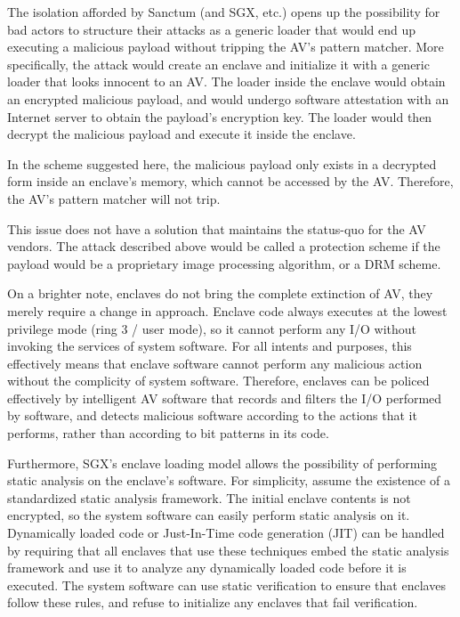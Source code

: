 The isolation afforded by Sanctum (and SGX, etc.) opens up the possibility for
bad actors to structure their attacks as a generic loader that would end up
executing a malicious payload without tripping the AV's pattern matcher.  More
specifically, the attack would create an enclave and initialize it with a
generic loader that looks innocent to an AV. The loader inside the enclave
would obtain an encrypted malicious payload, and would undergo software
attestation with an Internet server to obtain the payload's encryption key. The
loader would then decrypt the malicious payload and execute it inside the
enclave.

In the scheme suggested here, the malicious payload only exists in a decrypted
form inside an enclave's memory, which cannot be accessed by the AV. Therefore,
the AV's pattern matcher will not trip.

This issue does not have a solution that maintains the status-quo for the AV
vendors. The attack described above would be called a protection scheme if the
payload would be a proprietary image processing algorithm, or a DRM scheme.

On a brighter note, enclaves do not bring the complete extinction of AV, they
merely require a change in approach. Enclave code always executes at the lowest
privilege mode (ring 3 / user mode), so it cannot perform any I/O without
invoking the services of system software. For all intents and purposes, this
effectively means that enclave software cannot perform any malicious action
without the complicity of system software. Therefore, enclaves can be policed
effectively by intelligent AV software that records and filters the I/O
performed by software, and detects malicious software according to the actions
that it performs, rather than according to bit patterns in its code.

Furthermore, SGX's enclave loading model allows the possibility of performing
static analysis on the enclave's software. For simplicity, assume the existence
of a standardized static analysis framework.  The initial enclave contents is
not encrypted, so the system software can easily perform static analysis on it.
Dynamically loaded code or Just-In-Time code generation (JIT) can be handled by
requiring that all enclaves that use these techniques embed the static analysis
framework and use it to analyze any dynamically loaded code before it is
executed. The system software can use static verification to ensure that
enclaves follow these rules, and refuse to initialize any enclaves that fail
verification.

